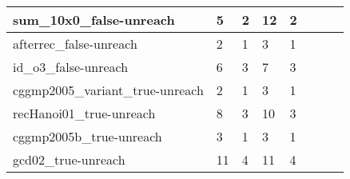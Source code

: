 \begin{table}
{\begin{tabular}{|l|l|l|l|l|l|l|}
    sum\_10x0\_false-unreach                                 & 5                                     & 2                                          & 12                                    & 2                                          & ~                                                               & ~                                        \\ \hline
    afterrec\_false-unreach                                  & 2                                     & 1                                          & 3                                     & 1                                          & ~                                                               & ~                                        \\ \hline
    id\_o3\_false-unreach                                    & 6                                     & 3                                          & 7                                     & 3                                          & ~                                                               & ~                                        \\ \hline
    cggmp2005\_variant\_true-unreach                         & 2                                     & 1                                          & 3                                     & 1                                          & ~                                                               & ~                                        \\ \hline
    recHanoi01\_true-unreach                                 & 8                                     & 3                                          & 10                                    & 3                                          & ~                                                               & ~                                        \\ \hline
    cggmp2005b\_true-unreach                                 & 3                                     & 1                                          & 3                                     & 1                                          & ~                                                               & ~                                        \\ \hline
    gcd02\_true-unreach                                      & 11                                    & 4                                          & 11                                    & 4                                          & ~                                                               & ~                                        \\ \hline

\end{tabular}}
\end{table}
